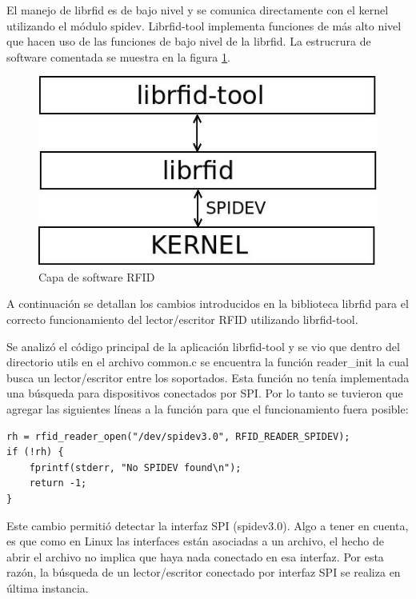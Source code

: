 El manejo de librfid es de bajo nivel y se comunica directamente con el kernel utilizando el módulo spidev. Librfid-tool implementa funciones de más alto nivel que hacen uso de las funciones de bajo nivel de la librfid. La estrucrura de software comentada se muestra en la figura \ref{sw_RFID}.

\begin{figure}[H]
\centering
  \begin{center}
  \includegraphics[scale=.4]{Imagenes/librfid-tool.jpg} 
  \end{center}
  \caption{Capa de software RFID}\label{sw_RFID} 
\end{figure}


A continuación se detallan los cambios introducidos en la biblioteca librfid para el correcto funcionamiento del lector/escritor RFID utilizando librfid-tool.

\bigskip
Se analizó el código principal de la aplicación librfid-tool y se vio que dentro del directorio utils en el archivo common.c se encuentra la función reader\_init la cual busca un lector/escritor entre los soportados. Esta función no tenía implementada una búsqueda para dispositivos conectados por SPI. Por lo tanto se tuvieron que agregar las siguientes líneas a la función para que el funcionamiento fuera posible:

\begin{verbatim}
rh = rfid_reader_open("/dev/spidev3.0", RFID_READER_SPIDEV);
if (!rh) {
    fprintf(stderr, "No SPIDEV found\n");
    return -1;
}
\end{verbatim}

Este cambio permitió detectar la interfaz SPI (spidev3.0). Algo a tener en cuenta, es que como en Linux las interfaces están asociadas a un archivo, el hecho de abrir el archivo no implica que haya nada conectado en esa interfaz. Por esta razón, la búsqueda de un lector/escritor conectado por interfaz SPI se realiza en última instancia.

